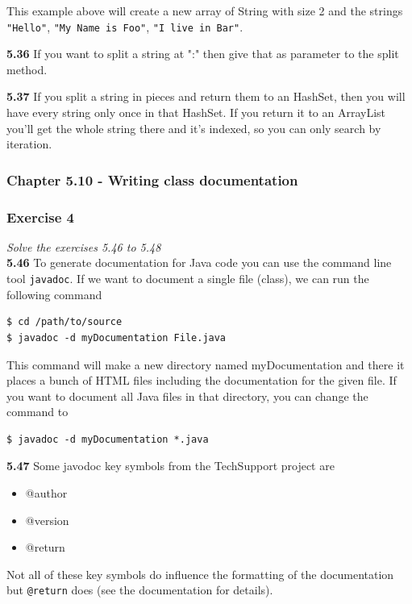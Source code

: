 This example above will create a new array of String with size 2 and the 
strings 
\lstinline{"Hello"}, \lstinline{"My Name is Foo"}, \lstinline{"I live in Bar"}.

\textbf{5.36} If you want to split a string at ":" then give that as parameter
to the split method.

\textbf{5.37} If you split a string in pieces and return them to an HashSet,
then you will have every string only once in that HashSet. If you return it
to an ArrayList you'll get the whole string there and it's indexed, so you can
only search by iteration.

\subsubsection{Chapter 5.10 - Writing class documentation}

\subsubsection*{Exercise 4}
\textit{Solve the exercises 5.46 to 5.48} \\

\textbf{5.46} To generate documentation for Java code you can use the command
line tool \lstinline{javadoc}. If we want to document a single file (class),
we can run the following command

\begin{lstlisting}
$ cd /path/to/source
$ javadoc -d myDocumentation File.java
\end{lstlisting}

This command will make a new directory named myDocumentation and there it
places a bunch of HTML files including the documentation for the given file.
If you want to document all Java files in that directory, you can change the
command to 

\begin{lstlisting}
$ javadoc -d myDocumentation *.java
\end{lstlisting}

\textbf{5.47} Some javodoc key symbols from the TechSupport project are
\begin{itemize}
	\item @author
	\item @version
	\item @return
\end{itemize}

Not all of these key symbols do influence the formatting of the documentation
but \lstinline{@return} does (see the documentation for details).

